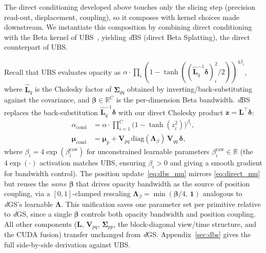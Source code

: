 \documentclass{article}
\newcommand{\dgs}{\textit{d}GS\xspace}
\newcommand{\dbs}{\textit{d}BS\xspace}
\theoremstyle{plain}
\theoremstyle{definition}
\theoremstyle{remark}
\begin{document}
The direct conditioning developed above touches only the slicing step (precision read-out, displacement, coupling), so it composes with kernel choices made downstream. We instantiate this composition by combining direct conditioning with the Beta kernel of UBS~\citep{liu2025universal}, yielding \dbs{} (direct Beta Splatting), the direct counterpart of UBS.

Recall that UBS evaluates opacity as $\alpha\cdot\prod_i (1-\tanh((\hat{\mathbf{L}}_q^{-1}\boldsymbol{\delta})_i^2/2))^{4\beta_i}$, where $\hat{\mathbf{L}}_q$ is the Cholesky factor of $\boldsymbol{\Sigma}_{qq}$ obtained by inverting/back-substituting against the covariance, and $\boldsymbol{\beta}\in\mathbb{R}^C$ is the per-dimension Beta bandwidth. \dbs{} replaces the back-substitution $\hat{\mathbf{L}}_q^{-1}\boldsymbol{\delta}$ with our direct Cholesky product $\mathbf{z}=\mathbf{L}^\top\boldsymbol{\delta}$:
\begin{align}
\alpha_{\text{cond}} &= \alpha \cdot \prod_{i=1}^{C} \bigl(1-\tanh(z_i^2)\bigr)^{\beta_i}, \label{eq:dbs_alpha}\\
\boldsymbol{\mu}_{\text{cond}} &= \boldsymbol{\mu}_p + \mathbf{V}_{pq}\,\mathrm{diag}(\boldsymbol{\Lambda}_\beta)\,\mathbf{V}_{qq}\,\boldsymbol{\delta}, \label{eq:dbs_mu}
\end{align}
where $\beta_i = 4\exp(\beta_i^{\text{raw}})$ for unconstrained learnable parameters $\beta_i^{\text{raw}}\in\mathbb{R}$ (the $4\exp(\cdot)$ activation matches UBS, ensuring $\beta_i > 0$ and giving a smooth gradient for bandwidth control). The position update~\eqref{eq:dbs_mu} mirrors \cref{eq:direct_mu} but reuses the \emph{same} $\boldsymbol{\beta}$ that drives opacity bandwidth as the source of position coupling, via a $[0,1]$-clamped rescaling $\boldsymbol{\Lambda}_\beta = \min(\boldsymbol{\beta}/4,\,\mathbf{1})$ analogous to \dgs{}'s learnable $\boldsymbol{\Lambda}$. This unification saves one parameter set per primitive relative to \dgs{}, since a single $\boldsymbol{\beta}$ controls both opacity bandwidth and position coupling. All other components ($\mathbf{L}$, $\mathbf{V}_{pq}$, $\boldsymbol{\Sigma}_{pp}$, the block-diagonal view/time structure, and the CUDA fusion) transfer unchanged from \dgs{}. Appendix~\ref{sec:dbs} gives the full side-by-side derivation against UBS.
\end{document}
